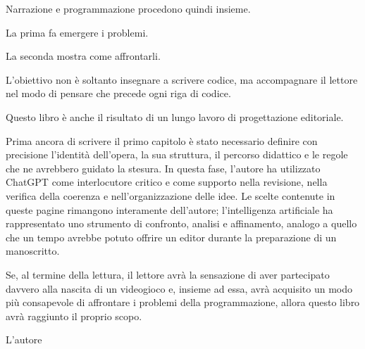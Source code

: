 \documentclass{article}
\begin{document}
Narrazione e programmazione procedono quindi insieme.

La prima fa emergere i problemi.

La seconda mostra come affrontarli.

L'obiettivo non è soltanto insegnare a scrivere codice, ma accompagnare il lettore nel modo di pensare che precede ogni
riga di codice.

Questo libro è anche il risultato di un lungo lavoro di progettazione editoriale.

Prima ancora di scrivere il primo capitolo è stato necessario definire con precisione l'identità dell'opera, la sua
struttura, il percorso didattico e le regole che ne avrebbero guidato la stesura. In questa fase, l'autore ha
utilizzato ChatGPT come interlocutore critico e come supporto nella revisione, nella verifica della coerenza e
nell'organizzazione delle idee. Le scelte contenute in queste pagine rimangono interamente dell'autore; l'intelligenza
artificiale ha rappresentato uno strumento di confronto, analisi e affinamento, analogo a quello che un tempo avrebbe
potuto offrire un editor durante la preparazione di un manoscritto.

Se, al termine della lettura, il lettore avrà la sensazione di aver partecipato davvero alla nascita di un videogioco e,
insieme ad essa, avrà acquisito un modo più consapevole di affrontare i problemi della programmazione, allora questo
libro avrà raggiunto il proprio scopo.

L'autore


\bigskip
\end{document}
